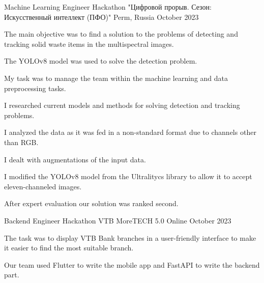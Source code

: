 

\begin{cventries}

\cventry
{Machine Learning Engineer} %
{Hackathon "Цифровой прорыв. Сезон: Искусственный интеллект (ПФО)"} %
{Perm, Russia} %
{October 2023} %
{
  \begin{cvitems} %
    \item {The main objective was to find a solution to the problems of detecting and tracking solid waste items in the multispectral images.}
    \item {The YOLOv8 model was used to solve the detection problem. } 
    \item {My task was to manage the team within the machine learning and data preprocessing tasks. }
    \item {I researched current models and methods for solving detection and tracking problems. }
    \item {I analyzed the data as it was fed in a non-standard format due to channels other than RGB. }
    \item {I dealt with augmentations of the input data. }
    \item {I modified the YOLOv8 model from the Ultralitycs library to allow it to accept eleven-channeled images. }
    \item {After expert evaluation our solution was ranked second. }
  \end{cvitems}
}
\cventry
{Backend Engineer} %
{Hackathon VTB MoreTECH 5.0} %
{Online} %
{October 2023} %
{
  \begin{cvitems} %
    \item {The task was to display VTB Bank branches in a user-friendly interface to make it easier to find the most suitable branch. }
    \item {Our team used Flutter to write the mobile app and FastAPI to write the backend part. } 

\end{cvitems}}
\end{cventries}
